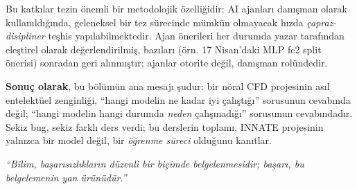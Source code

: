 Bu katkılar tezin önemli bir metodolojik özelliğidir: AI ajanları danışman olarak kullanıldığında, geleneksel bir tez sürecinde mümkün olmayacak hızda \textit{çapraz-disipliner} teşhis yapılabilmektedir. Ajan önerileri her durumda yazar tarafından eleştirel olarak değerlendirilmiş, bazıları (örn. 17 Nisan'daki MLP fc2 split önerisi) sonradan geri alınmıştır; ajanlar otorite değil, danışman rolündedir.

\textbf{Sonuç olarak}, bu bölümün ana mesajı şudur: bir nöral CFD projesinin asıl entelektüel zenginliği, ``hangi modelin ne kadar iyi çalıştığı'' sorusunun cevabında değil; ``hangi modelin hangi durumda \textit{neden} çalışmadığı'' sorusunun cevabındadır. Sekiz bug, sekiz farklı ders verdi; bu derslerin toplamı, INNATE projesinin yalnızca bir model değil, bir \textit{öğrenme süreci} olduğunu kanıtlar.

\medskip
\noindent\textit{``Bilim, başarısızlıkların düzenli bir biçimde belgelenmesidir; başarı, bu belgelemenin yan ürünüdür.''}
